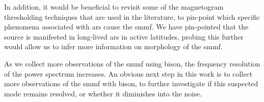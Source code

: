 In addition, it would be beneficial to revisit some of the magnetogram thresholding techniques that are used in the literature, to pin-point which specific phenomena associated with \glspl{ar} cause the \gls{smmf}. We have pin-pointed that the source is manifested in long-lived \glspl{ar} in active latitudes, probing this further would allow us to infer more information on morphology of the \gls{smmf}.

As we collect more observations of the \gls{smmf} using \gls{bison}, the frequency resolution of the power spectrum increases. An obvious next step in this work is to collect more observations of the \gls{smmf} with \gls{bison}, to further investigate if this suspected mode remains resolved, or whether it diminishes into the noise.